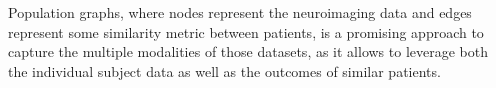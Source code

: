 Population graphs, where nodes represent the neuroimaging data and edges represent some similarity metric between patients, is a promising approach to capture the multiple modalities of those datasets, as it allows to leverage both the individual subject data as well as the outcomes of similar patients.








